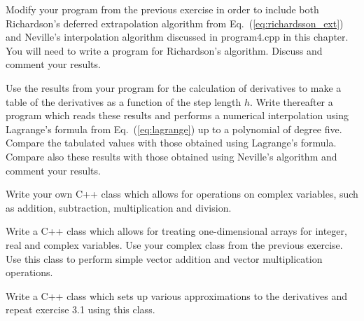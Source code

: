 \begin{prob}
Modify your program from the previous exercise in order to include both Richardson's deferred
extrapolation algorithm from Eq.~(\ref{eq:richardsson_ext}) and Neville's interpolation algorithm
discussed in program4.cpp in this chapter. 
You will need to write a program for Richardson's algorithm.
Discuss and comment your results. 

\end{prob}


\begin{prob}
Use the results from your program for the calculation of derivatives to 
make a table of the derivatives as a function of the step length $h$. 
Write thereafter a program which reads these results and performs a numerical interpolation
using Lagrange's formula from Eq.~(\ref{eq:lagrange}) up to a polynomial of degree five.
Compare the tabulated values with those obtained using Lagrange's formula.
Compare also these results with those obtained using Neville's algorithm and comment your results. 
\end{prob}


\begin{prob}
Write your own  C++ class which allows for operations on complex variables, such as addition, subtraction, 
multiplication and division.
\end{prob}



\begin{prob}
Write a C++ class which allows for treating one-dimensional arrays for integer, real and
complex variables. Use your complex class from the previous exercise.
Use this class to perform simple vector addition and vector multiplication operations.
\end{prob}


\begin{prob}
Write a C++ class which sets up various approximations to the derivatives and repeat 
exercise 3.1 using this class.  
\end{prob}



